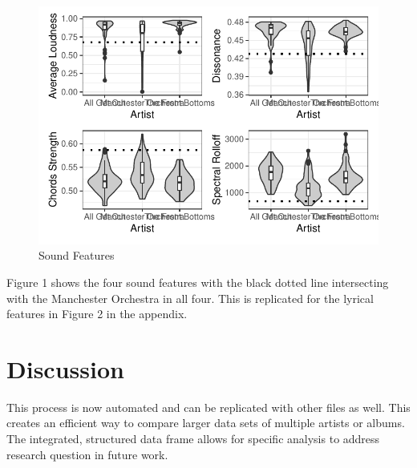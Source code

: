 \documentclass{article}\usepackage[]{graphicx}\usepackage[]{xcolor}
\makeatletter
\def\maxwidth{ %
  \ifdim\Gin@nat@width>\linewidth
    \linewidth
  \else
    \Gin@nat@width
  \fi
}
\newenvironment{knitrout}{}{} %
\makeatother
\begin{document}
\begin{multicols}{2}
\begin{figure}[H]
\begin{center}
\begin{knitrout}
\color{fgcolor}
\includegraphics[width=\maxwidth]{figure/unnamed-chunk-3-1} 
\end{knitrout}
\caption{Sound Features}
\label{lyrical} 
\end{center}
\end{figure}
Figure 1 shows the four sound features with the black dotted line intersecting with the Manchester Orchestra in all four. This is replicated for the lyrical features in Figure 2 in the appendix. 

\columnbreak
\section{Discussion}
 This process is now automated and can be replicated with other files as well. This creates an efficient way to compare larger data sets of multiple artists or albums. The integrated, structured data frame allows for specific analysis to address research question in future work. 



\vspace{2em}
\end{multicols} 
\begin{tiny}

\end{tiny}
\end{document}
